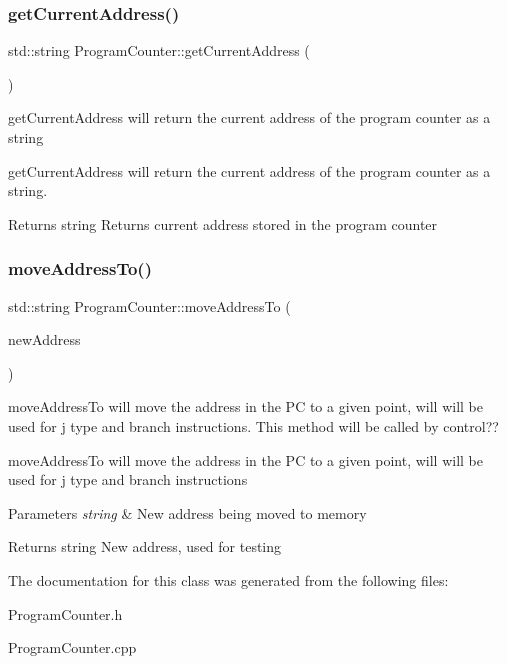 \subsubsection{\texorpdfstring{get\+Current\+Address()}{getCurrentAddress()}}
{\footnotesize\ttfamily std\+::string Program\+Counter\+::get\+Current\+Address (\begin{DoxyParamCaption}{ }\end{DoxyParamCaption})}

get\+Current\+Address will return the current address of the program counter as a string

get\+Current\+Address will return the current address of the program counter as a string. \begin{DoxyReturn}{Returns}
string Returns current address stored in the program counter 
\end{DoxyReturn}
\mbox{\label{class_program_counter_ac2587f6e388a7176d4e2dde5231924e0}} 
\subsubsection{\texorpdfstring{move\+Address\+To()}{moveAddressTo()}}
{\footnotesize\ttfamily std\+::string Program\+Counter\+::move\+Address\+To (\begin{DoxyParamCaption}\item[{std\+::string}]{new\+Address }\end{DoxyParamCaption})}

move\+Address\+To will move the address in the PC to a given point, will will be used for j type and branch instructions. This method will be called by control??

move\+Address\+To will move the address in the PC to a given point, will will be used for j type and branch instructions 
\begin{DoxyParams}{Parameters}
{\em string} & New address being moved to memory \\
\hline
\end{DoxyParams}
\begin{DoxyReturn}{Returns}
string New address, used for testing 
\end{DoxyReturn}


The documentation for this class was generated from the following files\+:\begin{DoxyCompactItemize}
\item 
Program\+Counter.\+h\item 
Program\+Counter.\+cpp\end{DoxyCompactItemize}
